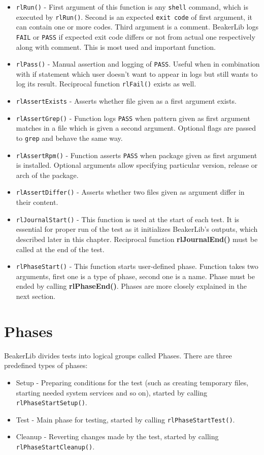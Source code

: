 \begin{itemize}
\item \texttt{rlRun()} - First argument of this function is any \texttt{shell} command, which is executed by \texttt{rlRun()}. Second is an expected \texttt{exit code} of first argument, it can contain one or more codes. Third argument is a comment. BeakerLib logs \texttt{FAIL} or \texttt{PASS} if expected exit code differs or not from actual one respectively along with comment. This is most used and important function.
\item \texttt{rlPass()} - Manual assertion and logging of \texttt{PASS}. Useful when in combination with if statement which user doesn't want to appear in logs but still wants to log its result. Reciprocal function \texttt{rlFail()} exists as well.
\item \texttt{rlAssertExists} - Asserts whether file given as a first argument exists.
\item \texttt{rlAssertGrep()} - Function logs \texttt{PASS} when pattern given as first argument matches in a file which is given a second argument. Optional flags are passed to \texttt{grep} and behave the same way.
\item \texttt{rlAssertRpm()} - Function asserts \texttt{PASS} when package given as first argument is installed.  Optional arguments allow specifying particular version, release or arch of the package.
\item \texttt{rlAssertDiffer()} - Asserts whether two files given as argument differ in their content. 
\item \texttt{rlJournalStart()} - This function is used at the start of each test. It is essential for proper run of the test as it initializes BeakerLib's  outputs, which described later in this chapter. Reciprocal function \textbf{rlJournalEnd()} must be called at the end of the test.
\item \texttt{rlPhaseStart()} - This function starts user-defined phase. Function takes two arguments, first one is a type of phase, second one is a name. Phase must be ended by calling \textbf{rlPhaseEnd()}. Phases are more closely explained in the next section.
\end{itemize}

\section{Phases}
BeakerLib divides tests into logical groups called Phases. There are three predefined types of phases:
\begin{itemize}
\item Setup - Preparing conditions for the test (such as creating temporary files, starting needed system services and so on), started by calling \texttt{rlPhaseStartSetup()}.
\item Test - Main phase for testing, started by calling \texttt{rlPhaseStartTest()}.
\item Cleanup - Reverting changes made by the test, started by calling \mbox{\texttt{rlPhaseStartCleanup()}}.
\end{itemize}

